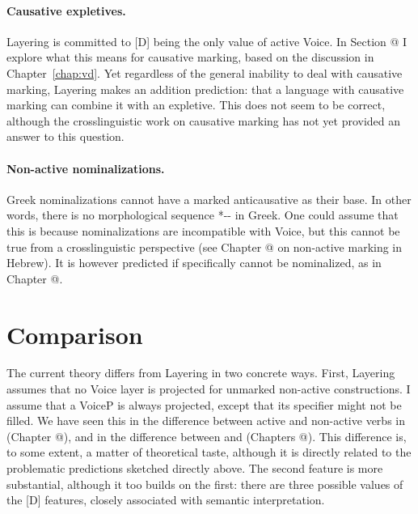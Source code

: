 \paragraph*{Causative expletives.} Layering is committed to [D] being the only value of active Voice. In Section @ I explore what this means for causative marking, based on the discussion in Chapter~\ref{chap:vd}. Yet regardless of the general inability to deal with causative marking, Layering makes an addition prediction: that a language with causative marking can combine it with an expletive. This does not seem to be correct, although the crosslinguistic work on causative marking has not yet provided an answer to this question.

\paragraph*{Non-active nominalizations.} Greek nominalizations cannot have a marked anticausative as their base. In other words, there is no morphological sequence *-- in Greek. One could assume that this is because nominalizations are incompatible with Voice, but this cannot be true from a crosslinguistic perspective (see Chapter @ on non-active marking in Hebrew). It is however predicted if specifically {\vz} cannot be nominalized, as in Chapter @.


\section{Comparison}
The current theory differs from Layering in two concrete ways. First, Layering assumes that no Voice layer is projected for unmarked non-active constructions. I assume that a VoiceP is always projected, except that its specifier might not be filled. We have seen this in the difference between active and non-active verbs in {\tkal} (Chapter @), and in the difference between {\vz} and {\vd} (Chapters @). This difference is, to some extent, a matter of theoretical taste, although it is directly related to the problematic predictions sketched directly above. The second feature is more substantial, although it too builds on the first: there are three possible values of the [D] features, closely associated with semantic interpretation.

